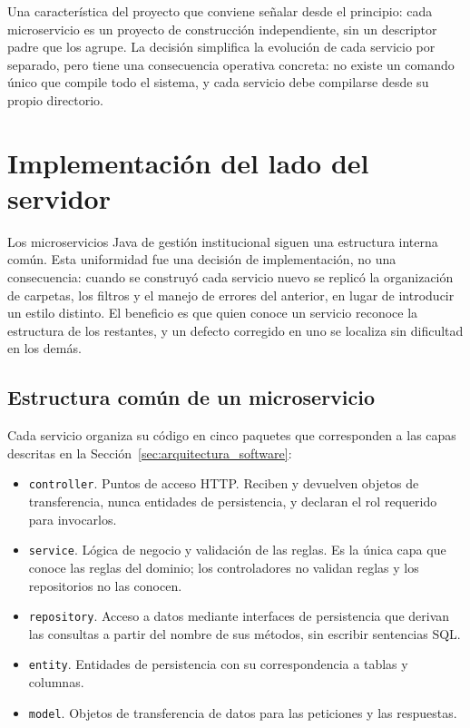 \normalsize
\setlength{\tabcolsep}{6pt}
\renewcommand{\arraystretch}{1}

Una característica del proyecto que conviene señalar desde el principio: cada microservicio es un
proyecto de construcción independiente, sin un descriptor padre que los agrupe. La decisión
simplifica la evolución de cada servicio por separado, pero tiene una consecuencia operativa
concreta: no existe un comando único que compile todo el sistema, y cada servicio debe compilarse
desde su propio directorio.

\section{Implementación del lado del servidor}
\label{sec:impl_backend}
Los microservicios Java de gestión institucional siguen una estructura interna común. Esta uniformidad
fue una decisión de implementación, no una consecuencia: cuando se construyó cada servicio nuevo
se replicó la organización de carpetas, los filtros y el manejo de errores del anterior, en lugar
de introducir un estilo distinto. El beneficio es que quien conoce un servicio reconoce la estructura de los restantes, y
un defecto corregido en uno se localiza sin dificultad en los demás.

\subsection{Estructura común de un microservicio}
Cada servicio organiza su código en cinco paquetes que corresponden a las capas descritas en la
Sección~\ref{sec:arquitectura_software}:

\begin{itemize}
	\item \texttt{controller}. Puntos de acceso HTTP. Reciben y devuelven objetos de
	transferencia, nunca entidades de persistencia, y declaran el rol requerido para invocarlos.

	\item \texttt{service}. Lógica de negocio y validación de las reglas. Es la única capa que
	conoce las reglas del dominio; los controladores no validan reglas y los repositorios no las
	conocen.

	\item \texttt{repository}. Acceso a datos mediante interfaces de persistencia que derivan las
	consultas a partir del nombre de sus métodos, sin escribir sentencias SQL.

	\item \texttt{entity}. Entidades de persistencia con su correspondencia a tablas y columnas.

	\item \texttt{model}. Objetos de transferencia de datos para las peticiones y las respuestas.
\end{itemize}

